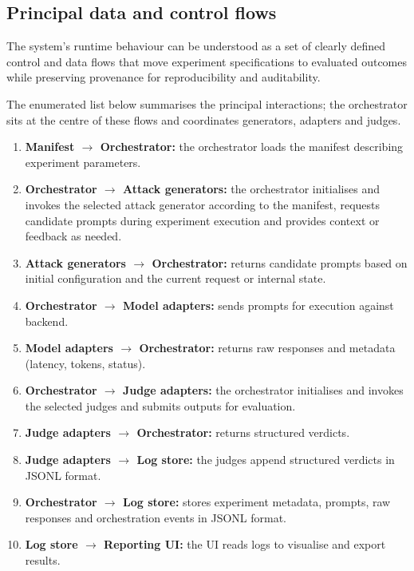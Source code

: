 \subsection{Principal data and control flows}\label{subsec:data-control-flows}

The system's runtime behaviour can be understood as a set of clearly defined control and data flows that move experiment specifications to evaluated outcomes while preserving provenance for reproducibility and auditability.

The enumerated list below summarises the principal interactions; the orchestrator sits at the centre of these flows and coordinates generators, adapters and judges.

\begin{enumerate}
  \item \textbf{Manifest $\rightarrow$ Orchestrator:} the orchestrator loads the manifest describing experiment parameters.
  \item \textbf{Orchestrator $\rightarrow$ Attack generators:} the orchestrator initialises and invokes the selected attack generator according to the manifest, requests candidate prompts during experiment execution and provides context or feedback as needed. 
  \item \textbf{Attack generators $\rightarrow$ Orchestrator:} returns candidate prompts based on initial configuration and the current request or internal state.
  \item \textbf{Orchestrator $\rightarrow$ Model adapters:} sends prompts for execution against backend.
  \item \textbf{Model adapters $\rightarrow$ Orchestrator:} returns raw responses and metadata (latency, tokens, status).
  \item \textbf{Orchestrator $\rightarrow$ Judge adapters:} the orchestrator initialises and invokes the selected judges and submits outputs for evaluation.
  \item \textbf{Judge adapters $\rightarrow$ Orchestrator:} returns structured verdicts.
  \item \textbf{Judge adapters $\rightarrow$ Log store:} the judges append structured verdicts in JSONL format.
  \item \textbf{Orchestrator $\rightarrow$ Log store:} stores experiment metadata, prompts, raw responses and orchestration events in JSONL format.
  \item \textbf{Log store $\rightarrow$ Reporting UI:} the UI reads logs to visualise and export results.
\end{enumerate}

